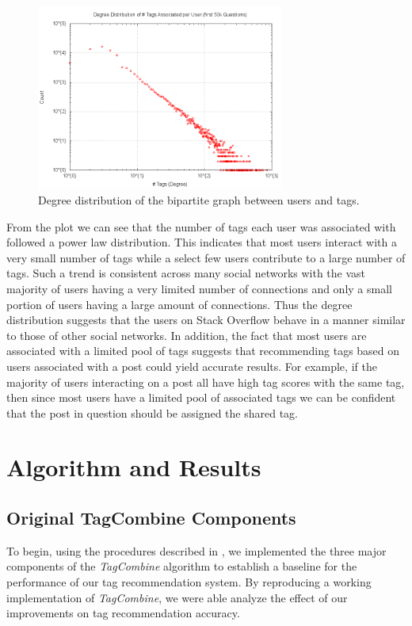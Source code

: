 \documentclass[11pt]{IEEEtran}
\begin{document}
\begin{figure}[h]
  \centering
    \includegraphics[width=3.2in]{bipartite_degdistr.png}
  \caption{Degree distribution of the bipartite graph between users and tags.}
  \label{fig:bi_dd}
\end{figure}

From the plot we can see that the number of tags each user was associated with followed a power law distribution. This indicates that most users interact with a very small number of tags while a select few users contribute to a large number of tags. Such a trend is consistent across many social networks with the vast majority of users having a very limited number of connections and only a small portion of users having a large amount of connections. Thus the degree distribution suggests that the users on Stack Overflow behave in a manner similar to those of other social networks. In addition, the fact that most users are associated with a limited pool of tags suggests that recommending tags based on users associated with a post could yield accurate results. For example, if the majority of users interacting on a post all have high tag scores with the same tag, then since most users have a limited pool of associated tags we can be confident that the post in question should be assigned the shared tag.

\section{Algorithm and Results}

\subsection{Original TagCombine Components}

To begin, using the procedures described in \cite{1}, we implemented the three major components of the \textit{TagCombine} algorithm to establish a baseline for the performance of our tag recommendation system. By reproducing a working implementation of \textit{TagCombine}, we were able analyze the effect of our improvements on tag recommendation accuracy.
\end{document}
